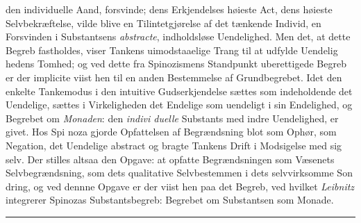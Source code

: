 \documentclass[12pt,a4paper]{book}
\newcommand{\divrule}{\begin{center}\rule{2cm}{0.4pt}\end{center}}
\begin{document}
den individuelle Aand, forsvinde; dens Erkjendelses høieste Act,
dens høieste Selvbekræftelse, vilde blive en Tilintetgjørelse af
det tænkende Individ, en Forsvinden i Substantsens \emph{abstracte},
indholdsløse Uendelighed. Men det, at dette Begreb fastholdes,
viser Tankens uimodstaaelige Trang til at udfylde Uendelig\-%
hedens Tomhed; og ved dette fra Spinozismens Standpunkt
uberettigede Begreb er der implicite viist hen til en anden
Bestemmelse af Grundbegrebet. Idet den enkelte Tankemodus
i den intuitive Gudserkjendelse sættes som indeholdende det
Uendelige, sættes i Virkeligheden det Endelige som uendeligt
i sin Endelighed, og Begrebet om \emph{Monaden}: den \emph{indivi\-%
duelle} Substants med indre Uendelighed, er givet. Hos Spi\-%
noza gjorde Opfattelsen af Begrændsning blot som Ophør, som
Negation, det Uendelige abstract og bragte Tankens Drift i
Modsigelse med sig selv. Der stilles altsaa den Opgave: at
opfatte Begrændsningen som Væsenets Selvbegrændsning, som
dets qualitative Selvbestemmen i dets selvvirksomme Son\-%
dring, og ved dennne Opgave er der viist hen paa det Begreb,
ved hvilket \emph{Leibnitz} integrerer Spinozas Substantsbegreb:
Begrebet om Substantsen som Monade.

\divrule
\end{document}
